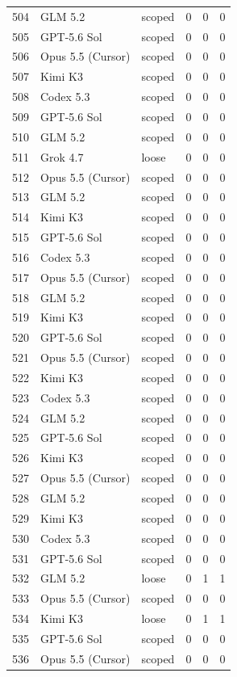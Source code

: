 \begin{tabular}{llllll}
504 & GLM 5.2 & scoped & 0 & 0 & 0 \\
505 & GPT-5.6 Sol & scoped & 0 & 0 & 0 \\
506 & Opus 5.5 (Cursor) & scoped & 0 & 0 & 0 \\
507 & Kimi K3 & scoped & 0 & 0 & 0 \\
508 & Codex 5.3 & scoped & 0 & 0 & 0 \\
509 & GPT-5.6 Sol & scoped & 0 & 0 & 0 \\
510 & GLM 5.2 & scoped & 0 & 0 & 0 \\
511 & Grok 4.7 & loose & 0 & 0 & 0 \\
512 & Opus 5.5 (Cursor) & scoped & 0 & 0 & 0 \\
513 & GLM 5.2 & scoped & 0 & 0 & 0 \\
514 & Kimi K3 & scoped & 0 & 0 & 0 \\
515 & GPT-5.6 Sol & scoped & 0 & 0 & 0 \\
516 & Codex 5.3 & scoped & 0 & 0 & 0 \\
517 & Opus 5.5 (Cursor) & scoped & 0 & 0 & 0 \\
518 & GLM 5.2 & scoped & 0 & 0 & 0 \\
519 & Kimi K3 & scoped & 0 & 0 & 0 \\
520 & GPT-5.6 Sol & scoped & 0 & 0 & 0 \\
521 & Opus 5.5 (Cursor) & scoped & 0 & 0 & 0 \\
522 & Kimi K3 & scoped & 0 & 0 & 0 \\
523 & Codex 5.3 & scoped & 0 & 0 & 0 \\
524 & GLM 5.2 & scoped & 0 & 0 & 0 \\
525 & GPT-5.6 Sol & scoped & 0 & 0 & 0 \\
526 & Kimi K3 & scoped & 0 & 0 & 0 \\
527 & Opus 5.5 (Cursor) & scoped & 0 & 0 & 0 \\
528 & GLM 5.2 & scoped & 0 & 0 & 0 \\
529 & Kimi K3 & scoped & 0 & 0 & 0 \\
530 & Codex 5.3 & scoped & 0 & 0 & 0 \\
531 & GPT-5.6 Sol & scoped & 0 & 0 & 0 \\
532 & GLM 5.2 & loose & 0 & 1 & 1 \\
533 & Opus 5.5 (Cursor) & scoped & 0 & 0 & 0 \\
534 & Kimi K3 & loose & 0 & 1 & 1 \\
535 & GPT-5.6 Sol & scoped & 0 & 0 & 0 \\
536 & Opus 5.5 (Cursor) & scoped & 0 & 0 & 0 \\

\end{tabular}
